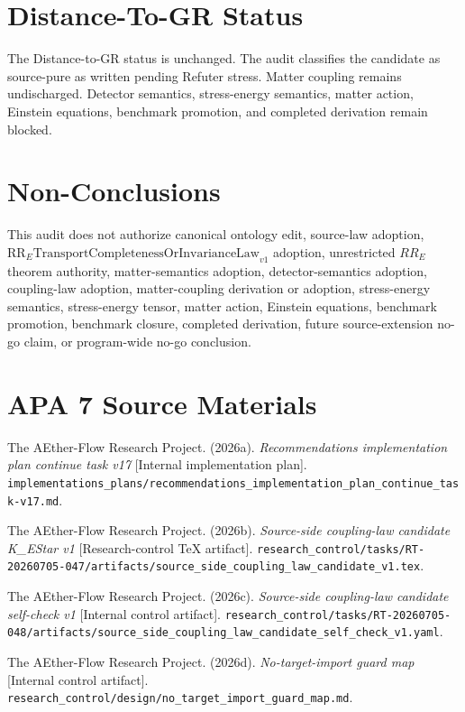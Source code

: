 \documentclass[11pt]{article}
\begin{document}
\section{Distance-To-GR Status}

The Distance-to-GR status is unchanged. The audit classifies the candidate as
source-pure as written pending Refuter stress. Matter coupling remains
undischarged. Detector semantics, stress-energy semantics, matter action,
Einstein equations, benchmark promotion, and completed derivation remain
blocked.

\section{Non-Conclusions}

This audit does not authorize canonical ontology edit, source-law adoption,
\(\mathrm{RR}_{E}\mathrm{TransportCompletenessOrInvarianceLaw}_{v1}\)
adoption, unrestricted \(RR_E\) theorem authority, matter-semantics adoption,
detector-semantics adoption, coupling-law adoption, matter-coupling derivation
or adoption, stress-energy semantics, stress-energy tensor, matter action,
Einstein equations, benchmark promotion, benchmark closure, completed
derivation, future source-extension no-go claim, or program-wide no-go
conclusion.

\section{APA 7 Source Materials}

The AEther-Flow Research Project. (2026a). \emph{Recommendations
implementation plan continue task v17} [Internal implementation plan].
\texttt{implementations\_plans/recommendations\_implementation\_plan\_continue\_task-v17.md}.

The AEther-Flow Research Project. (2026b). \emph{Source-side coupling-law
candidate K\_EStar v1} [Research-control TeX artifact].
\texttt{research\_control/tasks/RT-20260705-047/artifacts/source\_side\_coupling\_law\_candidate\_v1.tex}.

The AEther-Flow Research Project. (2026c). \emph{Source-side coupling-law
candidate self-check v1} [Internal control artifact].
\texttt{research\_control/tasks/RT-20260705-048/artifacts/source\_side\_coupling\_law\_candidate\_self\_check\_v1.yaml}.

The AEther-Flow Research Project. (2026d). \emph{No-target-import guard map}
[Internal control artifact].
\texttt{research\_control/design/no\_target\_import\_guard\_map.md}.
\end{document}
